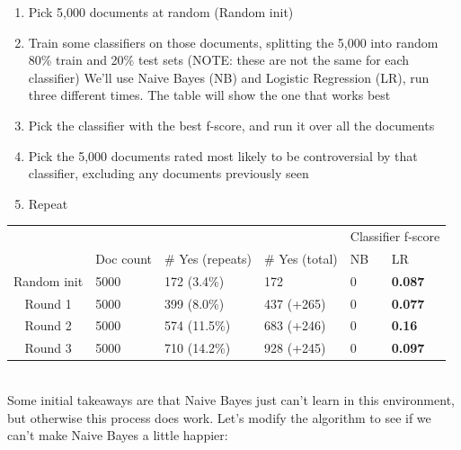 \documentclass[11pt]{article} %
\begin{document}
\begin{enumerate}
\item Pick 5,000 documents at random (Random init)
\item Train some classifiers on those documents, splitting the 5,000 into random 80\% train and 20\% test sets (NOTE: these are not the same for each classifier)
We'll use Naive Bayes (NB) and Logistic Regression (LR), run three different times. The table will show the one that works best
\item Pick the classifier with the best f-score, and run it over all the documents
\item Pick the 5,000 documents rated most likely to be controversial by that classifier, excluding any documents previously seen
\item Repeat
\end{enumerate}

\begin{tabular}{|c|l|l|l|l|l|}
\rowcolor{gray!50} &&&& \multicolumn{2}{|c|}{Classifier f-score} \\
\rowcolor{gray!50} & Doc count & \# Yes (repeats) & \# Yes (total) & NB & LR \\
Random init & 5000 & 172 (3.4\%)& 172 & 0 & \textbf{0.087} \\
Round 1 & 5000 & 399 (8.0\%) & 437 (+265)& 0 & \textbf{0.077} \\
Round 2 & 5000 & 574 (11.5\%) & 683 (+246) & 0 & \textbf{0.16} \\
Round 3 & 5000 & 710 (14.2\%) & 928 (+245) & 0 & \textbf{0.097} \\
\end{tabular}
\\
Some initial takeaways are that Naive Bayes just can't learn in this environment, but otherwise this process does work. Let's modify the algorithm to see if we can't make Naive Bayes a little happier:
\end{document}
